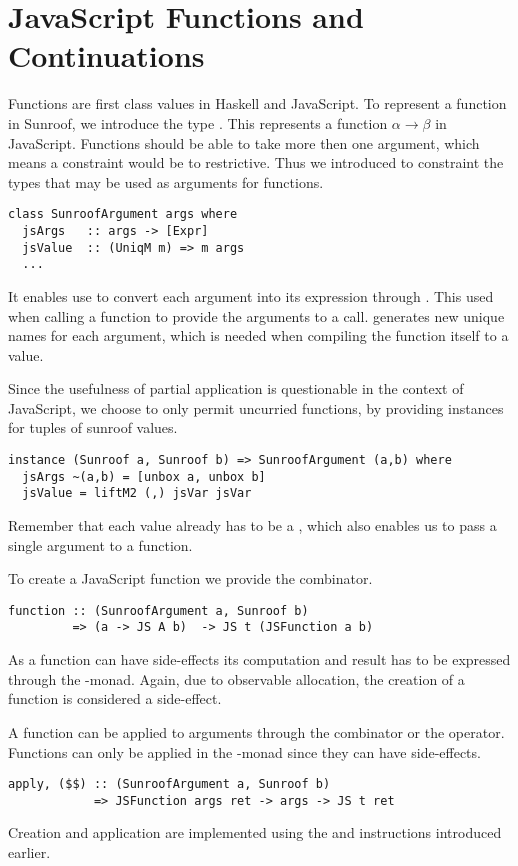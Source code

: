  
\section{JavaScript Functions and Continuations}
\label{sec:functions-continuations}

Functions are first class values in Haskell and JavaScript.
To represent a function in Sunroof, we introduce the type 
. This represents a function
$\alpha \rightarrow \beta$ in JavaScript. Functions should
be able to take more then one argument, which means a 
 constraint would be to restrictive.
Thus we introduced  to constraint the 
types that may be used as arguments for functions.
\begin{verbatim}
class SunroofArgument args where
  jsArgs   :: args -> [Expr]
  jsValue  :: (UniqM m) => m args
  ...
\end{verbatim}
It enables use to convert each argument into its expression
through . This used when calling a function to 
provide the arguments to a call.  generates
new unique names for each argument, which is needed when compiling
the function itself to a value. 

Since the usefulness of partial application is questionable in
the context of JavaScript, we choose to only permit uncurried functions,
by providing instances for tuples of sunroof values.
\begin{verbatim}
instance (Sunroof a, Sunroof b) => SunroofArgument (a,b) where
  jsArgs ~(a,b) = [unbox a, unbox b]
  jsValue = liftM2 (,) jsVar jsVar
\end{verbatim}
Remember that each  value already has to be 
a , which also enables us to pass a single argument
to a function. 

To create a JavaScript function we provide the  combinator.
\begin{verbatim}
function :: (SunroofArgument a, Sunroof b) 
         => (a -> JS A b)  -> JS t (JSFunction a b)
\end{verbatim}
As a function can have side-effects its computation and result has to be 
expressed through the \JS-monad. Again, due to observable allocation,
the creation of a function is considered a side-effect.

A function can be applied to arguments through the  combinator
or the \Src{\$\$} operator.
Functions can only be applied in the \JS-monad since they can have side-effects.
\begin{verbatim}
apply, ($$) :: (SunroofArgument a, Sunroof b) 
            => JSFunction args ret -> args -> JS t ret
\end{verbatim}
Creation and application are implemented using the 
and  instructions introduced earlier.

